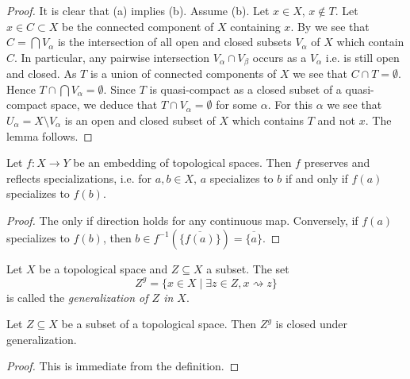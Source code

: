 \begin{proof}
  It is clear that (a) implies (b). Assume (b). Let $x \in X$, $x \notin T$. Let $x \in C \subset X$ be the connected component of $X$ containing $x$. By  we see that $C = \bigcap V_\alpha$ is the intersection of all open and closed subsets $V_\alpha$ of $X$ which contain $C$. In particular, any pairwise intersection $V_\alpha \cap V_\beta$ occurs as a $V_\alpha$ i.e. is still open and closed. As $T$ is a union of connected components of $X$ we see that $C \cap T = \emptyset$. Hence $T \cap \bigcap V_\alpha = \emptyset$. Since $T$ is quasi-compact as a closed subset of a quasi-compact space, we deduce that $T \cap V_\alpha = \emptyset$ for some $\alpha$. For this $\alpha$ we see that $U_\alpha = X \setminus V_\alpha$ is an open and closed subset of $X$ which contains $T$ and not $x$. The lemma follows.
\end{proof}

\begin{lemma}
    Let $f\colon X \to Y$ be an embedding of topological spaces. Then $f$ preserves and reflects
    specializations, i.e. for $a, b \in X$, $a$ specializes to $b$ if and only if $f(a)$ specializes to $f(b)$.
    \label{lemma:embedding-specializations}
\end{lemma}

\begin{proof}
    The only if direction holds for any continuous map. Conversely, if $f(a)$ specializes to $f(b)$, then
    $b \in f^{-1}(\overline{\{f(a)\}}) = \overline{\{a\} }$.
\end{proof}

\begin{definition}
    Let $X$ be a topological space and $Z \subseteq X$ a subset. The set
    \[
    Z^g = \{ x \in X \mid \exists z \in Z, x \rightsquigarrow z \}
    \] is called the \emph{generalization of $Z$ in $X$}.
    \label{def:generalization}
\end{definition}

\begin{lemma}
    Let $Z \subseteq X$ be a subset of a topological space. Then $Z^g$ is closed under generalization.
    \label{lemma:generalization-stable-generalization}
\end{lemma}

\begin{proof}
    This is immediate from the definition.
\end{proof}

